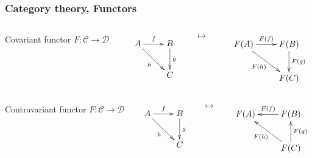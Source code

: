 \documentclass[10pt]{beamer}
\newcommand{\cat}[1]{\mathscr{#1}}
\newcommand{\C}{\cat{C}}
\newcommand{\D}{\cat{D}}
\newcommand{\ra}{\rightarrow}
\begin{document}
\begin{frame}
  \frametitle{Category theory, Functors}
  
  \begin{columns}
    \begin{column}{0.3\textwidth}
      Covariant functor $F:\C\ra\D$
    \end{column}

    \begin{column}{0.25\textwidth}
      \begin{equation*}
        \xymatrix{
          A \ar[r]^f \ar[dr]_{h} & B \ar[d]^g \\
          & C
        }
      \end{equation*}
    \end{column}
    \begin{column}{0.05\textwidth}
      $\mapsto$
    \end{column}
    \begin{column}{0.35\textwidth}
      \begin{equation*}
        \xymatrix{
          F(A) \ar[r]^{F(f)} \ar[dr]_{F(h)} & F(B) \ar[d]^{F(g)} \\
          & F(C)
        }    
      \end{equation*}
    \end{column}
  \end{columns}

  \begin{columns}
    \begin{column}{0.3\textwidth}
      Contravariant functor $F:\C\ra\D$
    \end{column}

    \begin{column}{0.25\textwidth}
      \begin{equation*}
        \xymatrix{
          A \ar[r]^f \ar[dr]_{h} & B \ar[d]^g \\
          & C
        }
      \end{equation*}
    \end{column}
    \begin{column}{0.05\textwidth}
      $\mapsto$
    \end{column}
    \begin{column}{0.35\textwidth}
      \begin{equation*}
        \xymatrix{
          F(A) & F(B) \ar[l]_{F(f)} \\
          & F(C) \ar[u]_{F(g)} \ar[ul]^{F(h)}
        }    
      \end{equation*}
    \end{column}
  \end{columns}


\end{frame}
\end{document}

